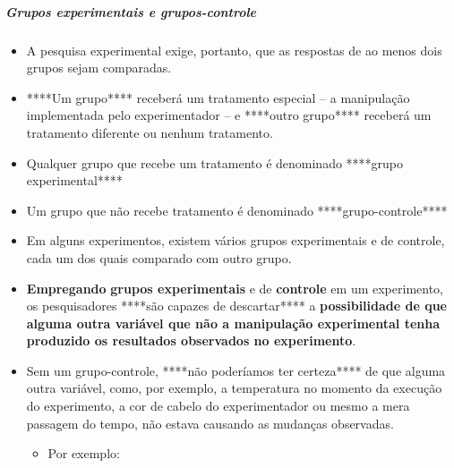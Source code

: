 \documentclass[
]{book}
\providecommand{\tightlist}{%
  \setlength{\itemsep}{0pt}\setlength{\parskip}{0pt}}
\begin{document}
\hypertarget{grupos-experimentais-e-grupos-controle}{%
\subparagraph{Grupos experimentais e grupos-controle}\label{grupos-experimentais-e-grupos-controle}}

\begin{itemize}
\tightlist
\item
  A pesquisa experimental exige, portanto, que as respostas de ao menos dois grupos sejam comparadas.
\item
  ****Um grupo**** receberá um tratamento especial -- a manipulação implementada pelo experimentador -- e ****outro grupo**** receberá um tratamento diferente ou nenhum tratamento.
\item
  Qualquer grupo que recebe um tratamento é denominado ****grupo experimental****
\item
  Um grupo que não recebe tratamento é denominado ****grupo-controle****
\item
  Em alguns experimentos, existem vários grupos experimentais e de controle, cada um dos quais comparado com outro grupo.
\item
  \textbf{Empregando} \textbf{grupos experimentais} e de \textbf{controle} em um experimento, os pesquisadores ****são capazes de descartar**** a \textbf{possibilidade de que alguma outra variável que não a manipulação experimental tenha produzido os resultados observados no experimento}.
\item
  Sem um grupo-controle, ****não poderíamos ter certeza**** de que alguma outra variável, como, por exemplo, a temperatura no momento da execução do experimento, a cor de cabelo do experimentador ou mesmo a mera passagem do tempo, não estava causando as mudanças observadas.

  \begin{itemize}
  \tightlist
  \item
    Por exemplo:


\end{itemize}
\end{itemize}
\end{document}
